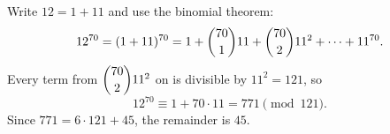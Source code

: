 Write $12=1+11$ and use the binomial theorem:
\[
12^{70}=(1+11)^{70}=1+\dbinom{70}{1}11+\dbinom{70}{2}11^2+\cdots+11^{70}.
\]
Every term from $\dbinom{70}{2}11^2$ on is divisible by $11^2=121$, so
\[
12^{70}\equiv1+70\cdot11=771\pmod{121}.
\]
Since $771=6\cdot121+45$, the remainder is $\boxed{45}$.
